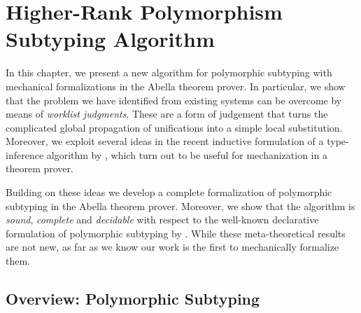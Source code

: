 \chapter{Higher-Rank Polymorphism Subtyping Algorithm}
\label{chap:ITP}

In this chapter, we present a new algorithm for polymorphic subtyping
with mechanical formalizations in the Abella theorem prover.
%
In particular, we show that the problem we have identified from existing systems
can be overcome by means of \emph{worklist judgments}.
These are a form of judgement that turns the complicated
global propagation of unifications into a simple local substitution.
Moreover, we exploit several ideas in the recent inductive
formulation of a type-inference algorithm by
\citet{dunfield2013complete}, which turn out to be useful
for mechanization in a theorem prover.

Building on these ideas we develop a complete formalization of
polymorphic subtyping in the Abella theorem prover. Moreover, we
 show that the algorithm is \emph{sound}, \emph{complete} and \emph{decidable} with
respect to the well-known declarative formulation of polymorphic subtyping by
\citet{odersky1996putting}.
While these meta-theoretical results are not new, as far
as we know our work is the first to mechanically formalize them.


\section{Overview: Polymorphic Subtyping}











